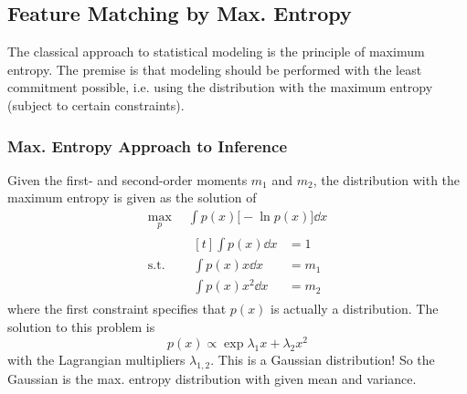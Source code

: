 		\subsection{Feature Matching by Max. Entropy}
			The classical approach to statistical modeling is the principle of maximum entropy. The premise is that modeling should be performed with the least commitment possible, i.e. using the distribution with the maximum entropy (subject to certain constraints).

			\subsubsection{Max. Entropy Approach to Inference}
				Given the first- and second-order moments \(m_1\) and \(m_2\), the distribution with the maximum entropy is given as the solution of
				\begin{equation*}
					\begin{aligned}
						\max_p \,           & \int\! p(x) \big[\! -\!\ln p(x) \big] \dd{x} \\
						\mathrm{s.t.} \quad &
						\begin{aligned}[t]
							\int\! p(x) \dd{x}     & = 1   \\
							\int\! p(x) x \dd{x}   & = m_1 \\
							\int\! p(x) x^2 \dd{x} & = m_2
						\end{aligned}
					\end{aligned}
				\end{equation*}
				where the first constraint specifies that \(p(x)\) is actually a distribution. The solution to this problem is
				\begin{equation*}
					p(x) \propto \exp{ \lambda_1 x + \lambda_2 x^2 }
				\end{equation*}
				with the Lagrangian multipliers \(\lambda_{1, 2}\). This is a Gaussian distribution! So the Gaussian is the max. entropy distribution with given mean and variance.

